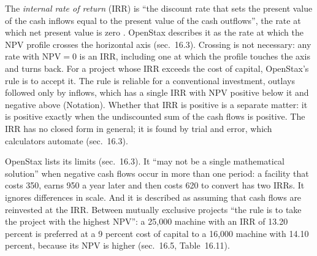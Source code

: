 \begin{qfmethod}\label{meth:internal-rate-of-return}
 The \emph{internal rate of return} (IRR) is ``the discount rate that sets the present value of the cash inflows equal to the present value of the cash outflows'', the rate at which net present value is zero \citep[sec.~16.3]{principles-of-finance-2026}. OpenStax describes it as the rate at which the NPV profile crosses the horizontal axis (sec.~16.3). Crossing is not necessary: any rate with $\mathrm{NPV}=0$ is an IRR, including one at which the profile touches the axis and turns back. For a project whose IRR exceeds the cost of capital, OpenStax's rule is to accept it. The rule is reliable for a conventional investment, outlays followed only by inflows, which has a single IRR with NPV positive below it and negative above (Notation). Whether that IRR is positive is a separate matter: it is positive exactly when the undiscounted sum of the cash flows is positive. The IRR has no closed form in general; it is found by trial and error, which calculators automate (sec.~16.3).

OpenStax lists its limits (sec.~16.3). It ``may not be a single mathematical solution'' when negative cash flows occur in more than one period: a facility that costs 350, earns 950 a year later and then costs 620 to convert has two IRRs. It ignores differences in scale. And it is described as assuming that cash flows are reinvested at the IRR. Between mutually exclusive projects ``the rule is to take the project with the highest NPV'': a 25{,}000 machine with an IRR of 13.20 percent is preferred at a 9 percent cost of capital to a 16{,}000 machine with 14.10 percent, because its NPV is higher (sec.~16.5, Table~16.11).


\end{qfmethod}
